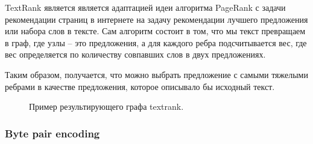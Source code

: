 \documentclass[14pt]{matmex-diploma-custom}
\begin{document}
TextRank является является адаптацией идеи алгоритма PageRank \cite{Page98thepagerank} с задачи рекомендации страниц в интернете на задачу рекомендации лучшего предложения или набора слов в тексте. Сам алгоритм состоит в том, что мы текст превращаем в граф, где узлы -- это предложения, а для каждого ребра подсчитывается вес, где вес определяется по количеству совпавших слов в двух предложениях.

Таким образом, получается, что можно выбрать предложение с самыми тяжелыми ребрами в качестве предложения, которое описывало бы исходный текст.

\begin{figure}[ht]
\begin{center}


\caption{
\label{text_rank_example_graph}
        Пример результирующего графа textrank.}
\end {center}
\end {figure}

\subsubsection{Byte pair encoding}
\end{document}
